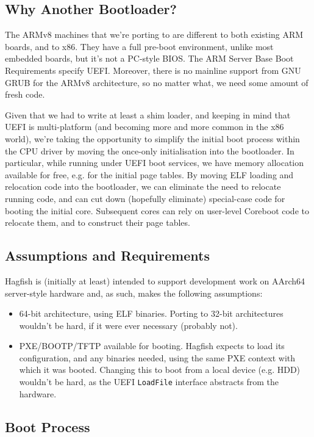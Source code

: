 \documentclass[a4paper,twoside]{report}
\begin{document}
\subsection{Why Another Bootloader?}

The ARMv8 machines that we're porting to are different to both existing ARM
boards, and to x86. They have a full pre-boot environment, unlike most
embedded boards, but it's not a PC-style BIOS. The ARM Server Base Boot
Requirements specify UEFI. Moreover, there is no mainline support from GNU
GRUB for the ARMv8 architecture, so no matter what, we need some amount of
fresh code.

Given that we had to write at least a shim loader, and keeping in mind that
UEFI is multi-platform (and becoming more and more common in the x86 world),
we're taking the opportunity to simplify the initial boot process within the
CPU driver by moving the once-only initialisation into the bootloader. In
particular, while running under UEFI boot services, we have memory allocation
available for free, e.g. for the initial page tables. By moving ELF loading
and relocation code into the bootloader, we can eliminate the need to relocate
running code, and can cut down (hopefully eliminate) special-case code for
booting the initial core. Subsequent cores can rely on user-level Coreboot
code to relocate them, and to construct their page tables.

\subsection{Assumptions and Requirements}

Hagfish is (initially at least) intended to support development work on
AArch64 server-style hardware and, as such, makes the following assumptions:

\begin{itemize}
\item 64-bit architecture, using ELF binaries. Porting to 32-bit architectures
wouldn't be hard, if it were ever necessary (probably not).
\item PXE/BOOTP/TFTP available for booting. Hagfish expects to load its
configuration, and any binaries needed, using the same PXE context with which
it was booted. Changing this to boot from a local device (e.g. HDD) wouldn't
be hard, as the UEFI \texttt{LoadFile} interface abstracts from the hardware.
\end{itemize}

\subsection{Boot Process}
\end{document}

